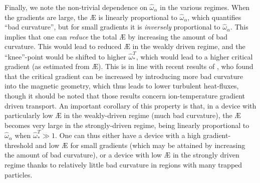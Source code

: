 Finally, we note the non-trivial dependence on $\hat{\omega}_\alpha$ in the various regimes. When the gradients are large, the \AE{} is linearly proportional to $\hat{\omega}_\alpha$, which quantifies ``bad curvature'', but for small gradients it is {\em inversely} proportional to $\hat{\omega}_\alpha$. This implies that one can \emph{reduce} the total \AE{} by increasing the amount of bad curvature. This would lead to reduced \AE{} in the weakly driven regime, and the ``knee''-point would be shifted to higher $\hat{\omega}_*^T$, which would lead to a higher critical gradient (as estimated from \AE{}). This is in line with recent results of \cite{roberg2022coarse,roberg2023critical}, who found that the critical gradient can be increased by introducing more bad curvature into the magnetic geometry, which thus leads to  lower turbulent heat-fluxes, though it should be noted that those results concern ion-temperature gradient driven transport. An important corollary of this property is that, in a device with particularly low \AE{} in the weakly-driven regime (much bad curvature), the \AE{} becomes very large in the strongly-driven regime, being linearly proportional to $\hat{\omega}_\alpha$ when $\hat{\omega}_*^T \gg 1$. One can thus either have a device with a high gradient-threshold and low \AE{} for small gradients (which may be attained by increasing the amount of bad curvature), or a device with low \AE{} in the strongly driven regime thanks to relatively little bad curvature in regions with many trapped particles.

